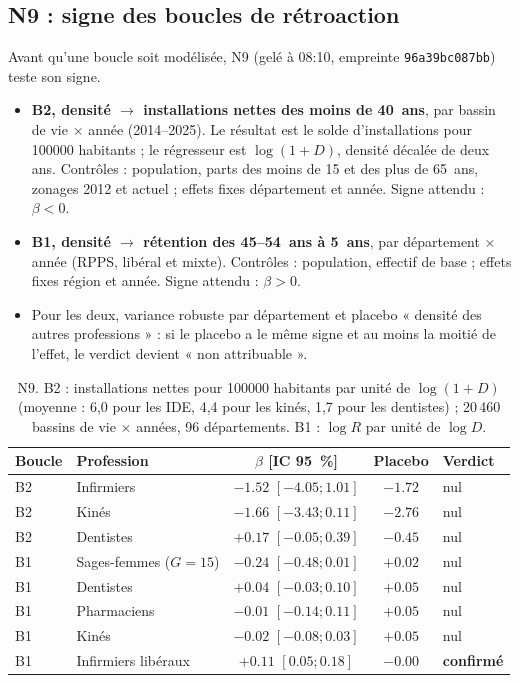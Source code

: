 \subsection{N9 : signe des boucles de rétroaction}
Avant qu'une boucle soit modélisée, N9 (gelé à 08:10, empreinte \texttt{96a39bc087bb}) teste son signe.
\begin{itemize}
  \item \textbf{B2, densité $\to$ installations nettes des moins de 40~ans}, par bassin de vie $\times$
        année (2014--2025). Le résultat est le solde d'installations pour \num{100000} habitants ; le
        régresseur est $\log(1 + D)$, densité décalée de deux ans. Contrôles : population, parts des
        moins de 15 et des plus de 65~ans, zonages 2012 et actuel ; effets fixes département et
        année. Signe attendu : $\beta < 0$.
  \item \textbf{B1, densité $\to$ rétention des 45--54~ans à 5~ans}, par département $\times$ année
        (RPPS, libéral et mixte). Contrôles : population, effectif de base ; effets fixes région et
        année. Signe attendu : $\beta > 0$.
  \item Pour les deux, variance robuste par département et placebo « densité des autres
        professions » : si le placebo a le même signe et au moins la moitié de l'effet, le verdict
        devient « non attribuable ».
\end{itemize}

\begin{table}[h]
\centering\small
\begin{tabular}{@{}llccl@{}}
\toprule
Boucle & Profession & $\beta$ [IC 95~\%] & Placebo & Verdict \\
\midrule
B2 & Infirmiers & $\num{-1.52}$ $[\num{-4.05} ; \num{1.01}]$ & $\num{-1.72}$ & nul \\
B2 & Kinés & $\num{-1.66}$ $[\num{-3.43} ; \num{0.11}]$ & $\num{-2.76}$ & nul \\
B2 & Dentistes & $+\num{0.17}$ $[\num{-0.05} ; \num{0.39}]$ & $\num{-0.45}$ & nul \\
B1 & Sages-femmes ($G = 15$) & $\num{-0.24}$ $[\num{-0.48} ; \num{0.01}]$ & $+\num{0.02}$ & nul \\
B1 & Dentistes & $+\num{0.04}$ $[\num{-0.03} ; \num{0.10}]$ & $+\num{0.05}$ & nul \\
B1 & Pharmaciens & $\num{-0.01}$ $[\num{-0.14} ; \num{0.11}]$ & $+\num{0.05}$ & nul \\
B1 & Kinés & $\num{-0.02}$ $[\num{-0.08} ; \num{0.03}]$ & $+\num{0.05}$ & nul \\
B1 & Infirmiers libéraux & $+\num{0.11}$ $[\num{0.05} ; \num{0.18}]$ & $\num{-0.00}$ & \textbf{confirmé} \\
\bottomrule
\end{tabular}
\caption{N9. B2 : installations nettes pour \num{100000} habitants par unité de $\log(1+D)$ (moyenne :
6,0 pour les IDE, 4,4 pour les kinés, 1,7 pour les dentistes) ; 20\,460 bassins de vie $\times$
années, 96 départements. B1 : $\log R$ par unité de $\log D$.\mesure{}}\label{a3-tab:n9}
\end{table}

